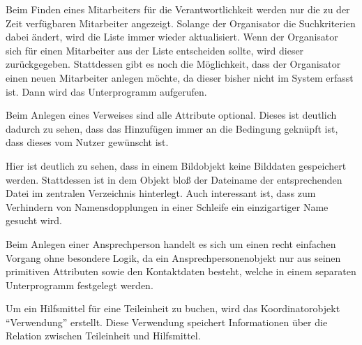 

Beim Finden eines Mitarbeiters für die Verantwortlichkeit werden nur die zu der Zeit verfügbaren Mitarbeiter angezeigt. Solange der Organisator die Suchkriterien dabei ändert, wird die Liste immer wieder aktualisiert. Wenn der Organisator sich für einen Mitarbeiter aus der Liste entscheiden sollte, wird dieser zurückgegeben. Stattdessen gibt es noch die Möglichkeit, dass der Organisator einen neuen Mitarbeiter anlegen möchte, da dieser bisher nicht im System erfasst ist. Dann wird das Unterprogramm  aufgerufen.



Beim Anlegen eines Verweises sind alle Attribute optional. Dieses ist deutlich dadurch zu sehen, dass das Hinzufügen immer an die Bedingung geknüpft ist, dass dieses vom Nutzer gewünscht ist.



Hier ist deutlich zu sehen, dass in einem Bildobjekt keine Bilddaten gespeichert werden. Stattdessen ist in dem Objekt bloß der Dateiname der entsprechenden Datei im zentralen Verzeichnis hinterlegt. Auch interessant ist, dass zum Verhindern von Namensdopplungen in einer Schleife ein einzigartiger Name gesucht wird.



Beim Anlegen einer Ansprechperson handelt es sich um einen recht einfachen Vorgang ohne besondere Logik, da ein Ansprechpersonenobjekt nur aus seinen primitiven Attributen sowie den Kontaktdaten besteht, welche in einem separaten Unterprogramm festgelegt werden.



Um ein Hilfsmittel für eine Teileinheit zu buchen, wird das Koordinatorobjekt \enquote{Verwendung} erstellt. Diese Verwendung speichert Informationen über die Relation zwischen Teileinheit und Hilfsmittel.

